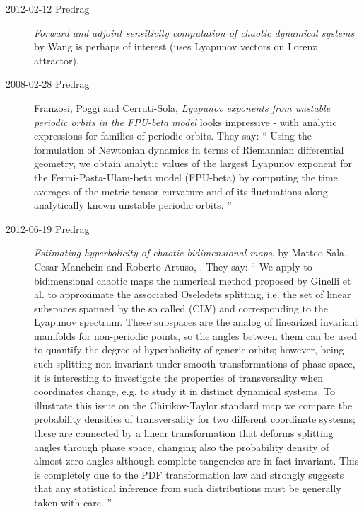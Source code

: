 \begin{description}
\item[2012-02-12 Predrag]
{\em Forward and adjoint sensitivity computation of chaotic dynamical
systems} by Wang is perhaps of interest (uses Lyapunov vectors
on Lorenz attractor).

\item[2008-02-28 Predrag]
Franzosi, Poggi and Cerruti-Sola,
{\em Lyapunov exponents from unstable periodic orbits
  in the {FPU}-beta model}
looks impressive -
    with analytic expressions for families of periodic orbits. They say:
    ``
Using the formulation of Newtonian dynamics in terms of Riemannian
differential geometry, we obtain analytic values of the largest
Lyapunov exponent for the Fermi-Pasta-Ulam-beta model (FPU-beta) by
computing the time averages of the metric tensor curvature and of its
fluctuations along analytically known unstable periodic orbits.
    ''

\item[2012-06-19 Predrag] {\em Estimating hyperbolicity of chaotic
    bidimensional maps}, by Matteo Sala, Cesar Manchein and Roberto
    Artuso, . They say: `` We apply to bidimensional
    chaotic maps the numerical method proposed by Ginelli et al. to
    approximate the associated Oseledets splitting, i.e. the set of
    linear subspaces spanned by the so called {\cLvs} (CLV) and
    corresponding to the Lyapunov spectrum. These subspaces are the
    analog of linearized invariant manifolds for non-periodic points,
    so the angles between them can be used to quantify the degree of
    hyperbolicity of generic orbits; however, being such splitting non
    invariant under smooth transformations of phase space, it is
    interesting to investigate the properties of transversality when
    coordinates change, e.g. to study it in distinct dynamical systems.
    To illustrate this issue on the Chirikov-Taylor standard map we
    compare the probability densities of transversality for two
    different coordinate systems; these are connected by a linear
    transformation that deforms splitting angles through phase space,
    changing also the probability density of almost-zero angles
    although complete tangencies are in fact invariant. This is
    completely due to the PDF transformation law and strongly suggests
    that any statistical inference from such distributions must be
    generally taken with care. ''


\end{description}
